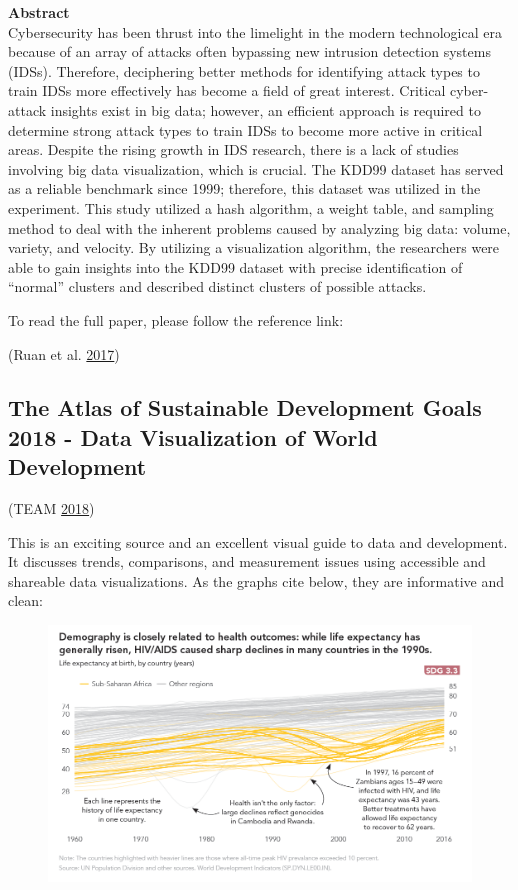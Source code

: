 \documentclass[]{book}
\theoremstyle{definition}
\theoremstyle{definition}
\theoremstyle{definition}
\theoremstyle{remark}
\begin{document}
\textbf{Abstract}\\
Cybersecurity has been thrust into the limelight in the modern
technological era because of an array of attacks often bypassing new
intrusion detection systems (IDSs). Therefore, deciphering better
methods for identifying attack types to train IDSs more effectively has
become a field of great interest. Critical cyber-attack insights exist
in big data; however, an efficient approach is required to determine
strong attack types to train IDSs to become more active in critical
areas. Despite the rising growth in IDS research, there is a lack of
studies involving big data visualization, which is crucial. The KDD99
dataset has served as a reliable benchmark since 1999; therefore, this
dataset was utilized in the experiment. This study utilized a hash
algorithm, a weight table, and sampling method to deal with the inherent
problems caused by analyzing big data: volume, variety, and velocity. By
utilizing a visualization algorithm, the researchers were able to gain
insights into the KDD99 dataset with precise identification of
``normal'' clusters and described distinct clusters of possible attacks.

To read the full paper, please follow the reference link:

(Ruan et al. \protect\hyperlink{ref-gapminder}{2017})

\subsection{The Atlas of Sustainable Development Goals 2018 - Data
Visualization of World
Development}\label{the-atlas-of-sustainable-development-goals-2018---data-visualization-of-world-development}

(TEAM \protect\hyperlink{ref-world_bank_data}{2018})

This is an exciting source and an excellent visual guide to data and
development. It discusses trends, comparisons, and measurement issues
using accessible and shareable data visualizations. As the graphs cite
below, they are informative and clean:

\begin{figure}
\centering
\includegraphics{images/case_study_1.png}
\caption{}
\end{figure}
\end{document}

